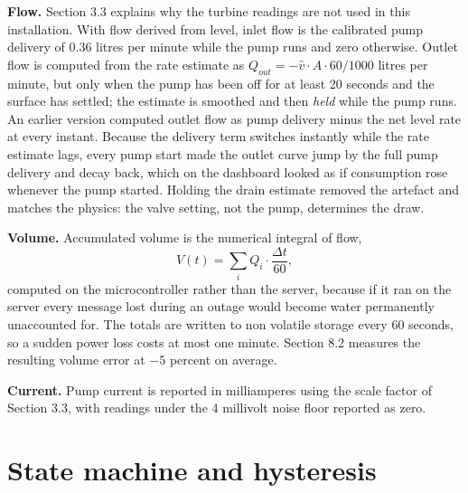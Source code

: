 \textbf{Flow.} Section 3.3 explains why the turbine readings are not used in this installation. With flow derived from level, inlet flow is the calibrated pump delivery of 0.36 litres per minute while the pump runs and zero otherwise. Outlet flow is computed from the rate estimate as $Q_{out} = -\hat{v} \cdot A \cdot 60/1000$ litres per minute, but only when the pump has been off for at least 20 seconds and the surface has settled; the estimate is smoothed and then \emph{held} while the pump runs. An earlier version computed outlet flow as pump delivery minus the net level rate at every instant. Because the delivery term switches instantly while the rate estimate lags, every pump start made the outlet curve jump by the full pump delivery and decay back, which on the dashboard looked as if consumption rose whenever the pump started. Holding the drain estimate removed the artefact and matches the physics: the valve setting, not the pump, determines the draw.

\textbf{Volume.} Accumulated volume is the numerical integral of flow,
\begin{equation}
V(t) = \sum_{i} Q_i \cdot \frac{\Delta t}{60},
\label{eq:volume}
\end{equation}
computed on the microcontroller rather than the server, because if it ran on the server every message lost during an outage would become water permanently unaccounted for. The totals are written to non volatile storage every 60 seconds, so a sudden power loss costs at most one minute. Section 8.2 measures the resulting volume error at $-5$ percent on average.

\textbf{Current.} Pump current is reported in milliamperes using the scale factor of Section 3.3, with readings under the 4 millivolt noise floor reported as zero.

\section{State machine and hysteresis}

